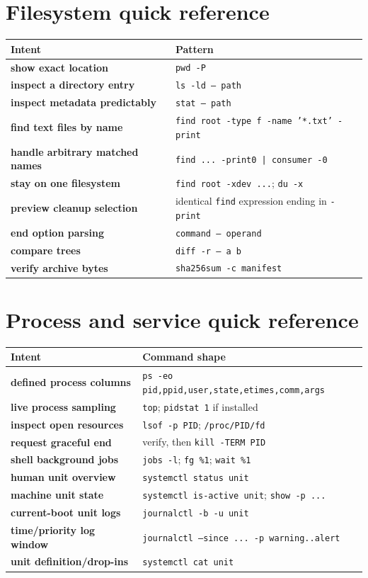 \documentclass[11pt,oneside,openany]{book}
\begin{document}
\section{Filesystem quick reference}
\begin{center}
\begin{tabularx}{0.96\textwidth}{>{\bfseries}p{}X}
\toprule
Intent & Pattern \\
\midrule
show exact location & \texttt{pwd -P} \\
inspect a directory entry & \texttt{ls -ld -- path} \\
inspect metadata predictably & \texttt{stat -- path} \\
find text files by name & \texttt{find root -type f -name '*.txt' -print} \\
handle arbitrary matched names & \texttt{find ... -print0 | consumer -0} \\
stay on one filesystem & \texttt{find root -xdev ...}; \texttt{du -x} \\
preview cleanup selection & identical \texttt{find} expression ending in \texttt{-print} \\
end option parsing & \texttt{command -- operand} \\
compare trees & \texttt{diff -r -- a b} \\
verify archive bytes & \texttt{sha256sum -c manifest} \\
\bottomrule
\end{tabularx}
\end{center}

\section{Process and service quick reference}
\begin{center}
\begin{tabularx}{0.96\textwidth}{>{\bfseries}p{}X}
\toprule
Intent & Command shape \\
\midrule
defined process columns & \texttt{ps -eo pid,ppid,user,state,etimes,comm,args} \\
live process sampling & \texttt{top}; \texttt{pidstat 1} if installed \\
inspect open resources & \texttt{lsof -p PID}; \texttt{/proc/PID/fd} \\
request graceful end & verify, then \texttt{kill -TERM PID} \\
shell background jobs & \texttt{jobs -l}; \texttt{fg \%1}; \texttt{wait \%1} \\
human unit overview & \texttt{systemctl status unit} \\
machine unit state & \texttt{systemctl is-active unit}; \texttt{show -p ...} \\
current-boot unit logs & \texttt{journalctl -b -u unit} \\
time/priority log window & \texttt{journalctl --since ... -p warning..alert} \\
unit definition/drop-ins & \texttt{systemctl cat unit} \\
\bottomrule
\end{tabularx}
\end{center}
\end{document}
